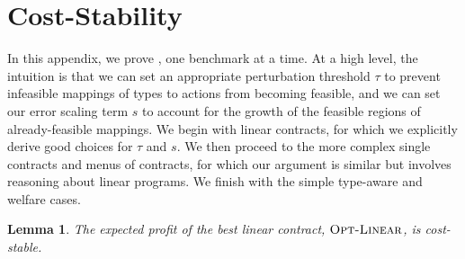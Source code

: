 \documentclass{article}
\newtheorem{lemma}[theorem]{Lemma}
\newcommand{\OLinear}{\textsc{Opt-Linear}}
\begin{document}
\section{Cost-Stability}
\label{apx:stability}

In this appendix, we prove , one benchmark at a time. At a high level, the intuition is that we can set an appropriate perturbation threshold $\tau$ to prevent infeasible mappings of types to actions from becoming feasible, and we can set our error scaling term $s$ to account for the growth of the feasible regions of already-feasible mappings. We begin with linear contracts, for which we explicitly derive good choices for $\tau$ and $s$. We then proceed to the more complex single contracts and menus of contracts, for which our argument is similar but involves reasoning about linear programs. We finish with the simple type-aware and welfare cases.

\begin{lemma}\label{lem:linear-stable}
  The expected profit of the best linear contract, $\OLinear$, is cost-stable.
\end{lemma}
\end{document}
